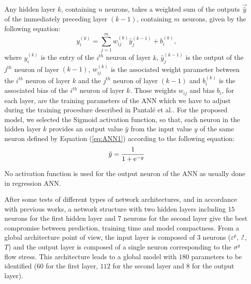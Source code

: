 \documentclass[metals,article,submit,pdftex,moreauthors]{Definitions/mdpi}
\makeatletter
\DeclareRobustCommand{\e}[1]{{\rm e}^{#1}}
\DeclareRobustCommand{\lay}[1]{^{(#1)}}
\DeclareRobustCommand{\mdot}[1]{\accentset{\mbox{\bfseries .}}{#1}}
\DeclareRobustCommand{\eal}{et al.\@\xspace}
\makeatother
\begin{document}
Any hidden layer $k$, containing $n$ neurons, takes a weighted sum of the outputs $\overrightarrow{\hat{y}}$ of the immediately preceding layer $(k-1)$, containing $m$ neurons, given by the following equation:
\begin{equation}
y_i\lay{k} = \sum_{j=1}^m w_{ij}\lay{k} \hat{y}_j^{(k-1)}+ b_i\lay{k},\label{eq:ANN1}
\end{equation}
where $y_i\lay{k}$ is the entry of the $i^{th}$ neuron of layer $k$, $\hat{y}_j\lay{k-1}$ is the output of the $j^{th}$ neuron of layer $(k-1)$, $w_{ij}\lay{k}$ is the associated weight parameter between the $i^{th}$ neuron of layer $k$ and the $j^{th}$ neuron of layer $(k-1)$ and $b_i\lay{k}$ is the associated bias of the $i^{th}$ neuron of layer $k$.
Those weights $w_{ij}$ and bias $b_i$, for each layer, are the training parameters of the ANN which we have to adjust during the training procedure described in Pantalé \eal \cite{Pantale-2021, Pantale-2023}.
For the proposed model, we selected the Sigmoid activation function, so that, each neuron in the hidden layer $k$ provides an output value ${\hat{y}}$ from the input value $y$ of the same neuron defined by Equation (\ref{eq:ANN1}) according to the following equation:
\begin{equation}
\hat{y}=\frac{1}{1 + \e{-y}}\label{eq:ANN2}
\end{equation}

No activation function is used for the output neuron of the ANN as usually done in regression ANN.

After some tests of different types of network architectures, and in accordance with previous works, a network structure with two hidden layers including $15$ neurons for the first hidden layer and $7$ neurons for the second layer give the best compromise between prediction, training time and model compactness.
From a global architecture point of view, the input layer is composed of $3$ neurons ($\varepsilon^p$, $\mdot\varepsilon$, $T$) and the output layer is composed of a single neuron corresponding to the $\sigma^y$ flow stress.
This architecture leads to a global model with $180$ parameters to be identified ($60$ for the first layer, $112$ for the second layer and $8$ for the output layer).
\end{document}
